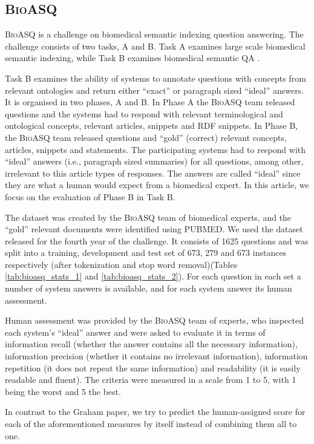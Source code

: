\documentclass[11pt,a4paper]{article}
\newcommand{\bioasq}{\textsc{BioASQ}\xspace}
\begin{document}
\subsection{\bioasq}
\label{ssec:bioasq}

\bioasq is a challenge on biomedical semantic indexing question answering. The challenge 
consists of two tasks, A and B. Task A examines large scale biomedical semantic indexing, 
while Task B examines biomedical semantic QA \cite{Tsatsaronis:2015}. 

Task B examines the ability of systems to annotate questions with concepts from 
relevant ontologies and return either “exact” or paragraph sized “ideal” answers. 
It is organised in two phases, A and B. In Phase A the \bioasq team released questions 
and the systems had to respond with relevant terminological and ontological concepts, 
relevant articles, snippets and RDF snippets. In Phase B, the \bioasq team released questions 
and “gold” (correct) relevant concepts, articles, snippets and statements. The participating 
systems had to respond with “ideal” answers (i.e., paragraph sized summaries) for all 
questions, among other, irrelevant to this article types of responses. The answers are 
called “ideal” since they are what a human would expect from a biomedical expert. In this 
article, we focus on the evaluation of Phase B in Task B.

The dataset was created by the \bioasq team of biomedical experts, and the “gold” 
relevant documents were identified using PUBMED. We used the dataset released for 
the fourth year of the challenge. It consists of 1625 questions and was split into 
a training,  development and test set of 673, 279 and 673 instances respectively 
(after tokenization and stop word removal)(Tables \ref{tab:bioasq_stats_1} and \ref{tab:bioasq_stats_2}). For each 
question in each set a number of system answers is available, and for each system 
answer its human assessment.

Human assessment was provided by the \bioasq team of experts, who inspected 
each system's “ideal” answer and were asked to evaluate it in terms of information
recall (whether the answer contains all the necessary information), information 
precision (whether it contains no irrelevant information), information repetition 
(it does not repeat the same information) and readability (it is easily readable and fluent). 
The criteria were measured in a scale from 1 to 5, with 1 being the worst and 5 the best.

In contrast to the Graham paper, we try to predict the human-assigned
score for each of the aforementioned measures by itself instead of combining
them all to one.
\end{document}
